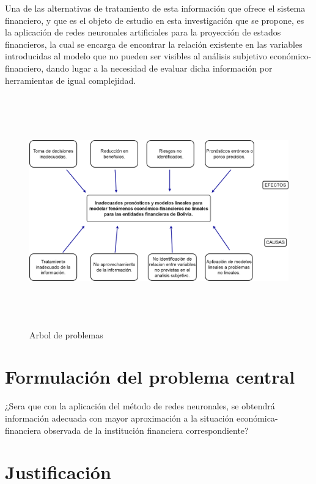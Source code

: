 \documentclass[
  12pt,
]{article}
\begin{document}
Una de las alternativas de tratamiento de esta información que ofrece el
sistema financiero, y que es el objeto de estudio en esta investigación
que se propone, es la aplicación de redes neuronales artificiales para
la proyección de estados financieros, la cual se encarga de encontrar la
relación existente en las variables introducidas al modelo que no pueden
ser visibles al análisis subjetivo económico-financiero, dando lugar a
la necesidad de evaluar dicha información por herramientas de igual
complejidad.

\begin{figure}[h!]
\centering
\includegraphics[width=15cm, height=10cm]{RECURSOS-PLAN-DE-INVESTIGACION/003-PLANTEAMIENTO-DEL-PROBLEMA/arbol-de-problemas.png}
\caption{Arbol de problemas}
\end{figure}

\hypertarget{formulaciuxf3n-del-problema-central}{%
\section{Formulación del problema
central}\label{formulaciuxf3n-del-problema-central}}

¿Sera que con la aplicación del método de redes neuronales, se obtendrá
información adecuada con mayor aproximación a la situación
económica-financiera observada de la institución financiera
correspondiente?

\hypertarget{justificaciuxf3n}{%
\section{Justificación}\label{justificaciuxf3n}}
\end{document}
